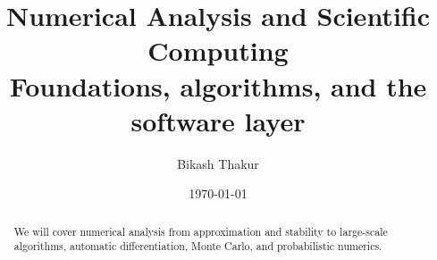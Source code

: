 \documentclass[11pt]{article}
\title{%
    {\sffamily\huge\bfseries\color{DarkNavy} Numerical Analysis and Scientific Computing}\\[6pt]
    {\sffamily\large\color{AccentGray} Foundations, algorithms, and the software layer}
}
\author{{\sffamily Bikash Thakur}}
\date{{\sffamily\small\color{AccentGray} \today}}
\begin{document}

\pagecolor{OffWhite}
\color{DarkNavy}

\maketitle
\thispagestyle{plain}

\begin{abstract}
\noindent
We will cover numerical analysis from approximation and stability to large-scale algorithms, automatic differentiation, Monte Carlo, and probabilistic numerics.
\end{abstract}

\tableofcontents
\newpage



\printindex
\end{document}
